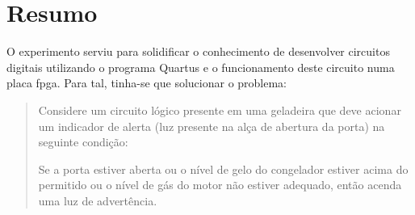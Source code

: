 \chapter{Resumo}
O experimento serviu para solidificar o conhecimento de desenvolver circuitos digitais utilizando o
programa Quartus e o funcionamento deste circuito numa placa \ac{fpga}. Para tal, tinha-se que solucionar
o problema:
\begin{quote}
	Considere um circuito lógico presente em uma geladeira que deve acionar um
	indicador de alerta (luz presente na alça de abertura da porta) na seguinte condição:

	Se a porta estiver aberta ou o nível de gelo do congelador estiver acima do permitido ou o
	nível de gás do motor não estiver adequado, então acenda uma luz de advertência.
\end{quote}

